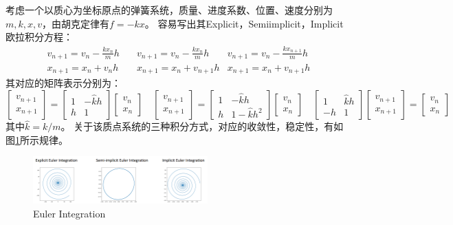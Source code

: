 \documentclass[lang=cn,newtx,10pt,scheme=chinese]{elegantbook}
\begin{document}
考虑一个以质心为坐标原点的弹簧系统，质量、进度系数、位置、速度分别为$m,k,x,v$，由胡克定律有$f=-kx$。
容易写出其Explicit，Semi\-implicit，Implicit欧拉积分方程：
\begin{equation}
  \begin{aligned}
  v_{n+1}=v_n-\frac{k x_n}{m} h &\quad v_{n+1}=v_n-\frac{k x_n}{m} h &
  v_{n+1}=v_n-\frac{k x_{n+1}}{m} h \\
  x_{n+1}=x_n+v_n h &\quad  x_{n+1}=x_n+v_{n+1} h &x_{n+1}=x_n+v_{n+1} h
  \end{aligned}
\end{equation}
其对应的矩阵表示分别为：
\begin{equation}
  \left[\begin{array}{l}
  v_{n+1} \\
  x_{n+1}
  \end{array}\right]=\left[\begin{array}{cc}
  1 & -\hat{k} h \\
  h & 1
  \end{array}\right]\left[\begin{array}{l}
  v_n \\
  x_n
  \end{array}\right] \quad\left[\begin{array}{l}
  v_{n+1} \\
  x_{n+1}
  \end{array}\right]=\left[\begin{array}{cc}
  1 & -\hat{k} h \\
  h & 1-\hat{k} h^2
  \end{array}\right]\left[\begin{array}{c}
  v_n \\
  x_n
  \end{array}\right] \quad\left[\begin{array}{cc}
  1 & \hat{k} h \\
  -h & 1
  \end{array}\right]\left[\begin{array}{l}
  v_{n+1} \\
  x_{n+1}
  \end{array}\right]=\left[\begin{array}{l}
  v_n \\
  x_n
  \end{array}\right]
\end{equation}其中$\hat{k}=k/m$。
关于该质点系统的三种积分方式，对应的收敛性，稳定性，有如图\ref{fig:EulerIntegration}所示规律。
\begin{figure}[htbp]
  \centering
  \includegraphics[width=0.6\textwidth]{./image/EulerIntegration}
  \caption{Euler Integration \label{fig:EulerIntegration}}
\end{figure}
\end{document}
